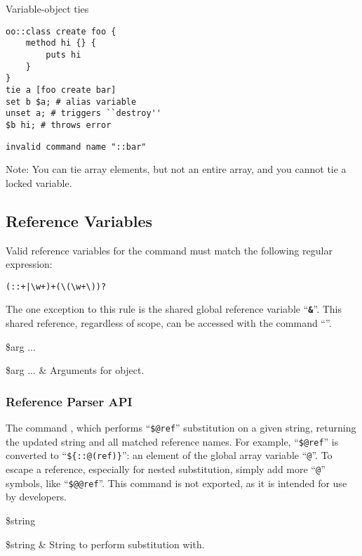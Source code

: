 \documentclass{article}
\begin{document}
\begin{example}{Variable-object ties}
\begin{lstlisting}
oo::class create foo {
    method hi {} {
        puts hi
    }
}
tie a [foo create bar]
set b $a; # alias variable
unset a; # triggers ``destroy''
$b hi; # throws error
\end{lstlisting}
\tcblower
\begin{lstlisting}
invalid command name "::bar"
\end{lstlisting}
\end{example}

Note: You can tie array elements, but not an entire array, and you cannot tie a locked variable.
\clearpage
\subsection{Reference Variables}
Valid reference variables for the  command must match the following regular expression:
\begin{lstlisting}
(::+|\w+)+(\(\w+\))?
\end{lstlisting}
The one exception to this rule is the shared global reference variable ``\textbf{\texttt{\&}}''.
This shared reference, regardless of scope, can be accessed with the command ``\textbf{\texttt{\cmdlink{\$\&}}}''.
\begin{syntax}
\command{\$\&} \$arg ...
\end{syntax}
\begin{args}
\$arg ... & Arguments for object.
\end{args}

\subsubsection{Reference Parser API}
The command , which performs ``\texttt{\$@ref}'' substitution on a given string, returning the updated string and all matched reference names. 
For example, ``\texttt{\$@ref}'' is converted to ``\texttt{\$\{::@(ref)\}}'': an element of the global array variable ``\texttt{@}''.
To escape a reference, especially for nested substitution, simply add more ``\texttt{@}'' symbols, like ``\texttt{\$@@ref}''.
This command is not exported, as it is intended for use by developers.
\begin{syntax}
 \$string
\end{syntax}
\begin{args}
\$string & String to perform substitution with.
\end{args}
\end{document}
